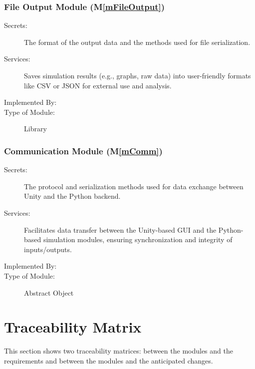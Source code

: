 \documentclass[12pt, titlepage]{article}
\newcommand{\mref}[1]{M\ref{#1}}
\begin{document}
\subsubsection{File Output Module (\mref{mFileOutput})}

\begin{description}
\item[Secrets:] The format of the output data and the methods used for file serialization.
\item[Services:] Saves simulation results (e.g., graphs, raw data) into user-friendly formats like CSV or JSON for external use and analysis.
\item[Implemented By:] \progname{}
\item[Type of Module:] Library
\end{description}

\subsubsection{Communication Module (\mref{mComm})}

\begin{description}
\item[Secrets:] The protocol and serialization methods used for data exchange between Unity and the Python backend.
\item[Services:] Facilitates data transfer between the Unity-based GUI and the Python-based simulation modules, ensuring synchronization and integrity of inputs/outputs.
\item[Implemented By:] \progname{}
\item[Type of Module:] Abstract Object
\end{description}

\section{Traceability Matrix} \label{SecTM}

This section shows two traceability matrices: between the modules and the
requirements and between the modules and the anticipated changes.
\end{document}
